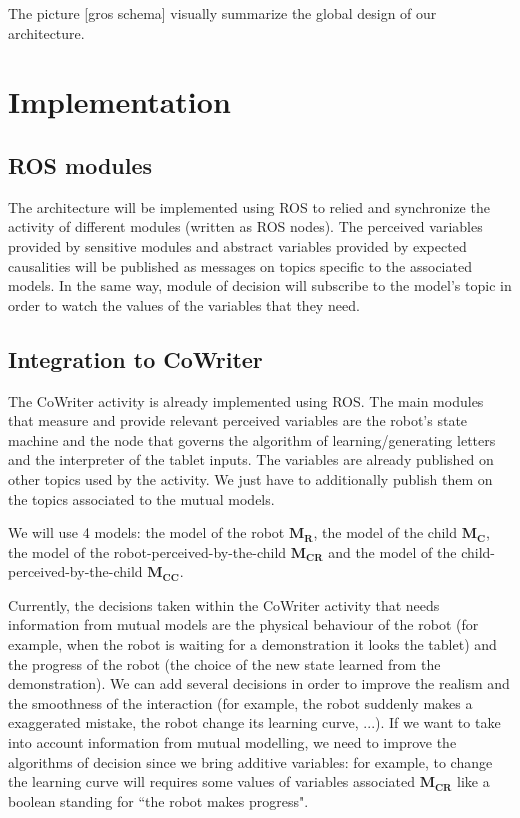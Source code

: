 \documentclass[10pt,a4paper,twocolumn]{article}
\begin{document}
The picture [gros schema] visually summarize the global design of our architecture. 

\section{Implementation}

\subsection{ROS modules}

The architecture will be implemented using ROS to relied and synchronize the activity of different modules (written as ROS nodes). The perceived variables provided by sensitive modules and abstract variables provided by expected causalities will be published as messages on topics specific to the associated models. In the same way, module of decision will subscribe to the model's topic in order to watch the values of the variables that they need. 

\subsection{Integration to CoWriter}

The CoWriter activity is already implemented using ROS. The main modules that measure and provide relevant perceived variables are the robot's state machine and the node that governs the algorithm of learning/generating letters and the interpreter of the tablet inputs. The variables are already published on other topics used by the activity. We just have to additionally publish them on the topics associated to the mutual models. 

We will use 4 models: the model of the robot $\textbf{M}_\textbf{R}$, the model of the child $\textbf{M}_\textbf{C}$, the model of the robot-perceived-by-the-child $\textbf{M}_\textbf{CR}$ and the model of the child-perceived-by-the-child $\textbf{M}_\textbf{CC}$.

Currently, the decisions taken within the CoWriter activity that needs information from mutual models are the physical behaviour of the robot (for example, when the robot is waiting for a demonstration it looks the tablet) and the progress of the robot (the choice of the new state learned from the demonstration). We can add several decisions in order to improve the realism and the smoothness of the interaction (for example, the robot suddenly makes a exaggerated mistake, the robot change its learning curve, ...). If we want to take into account information from mutual modelling, we need to improve the algorithms of decision since we bring additive variables: for example, to change the learning curve will requires some values of variables associated $\textbf{M}_\textbf{CR}$ like a boolean standing for ``the robot makes progress".
\end{document}
